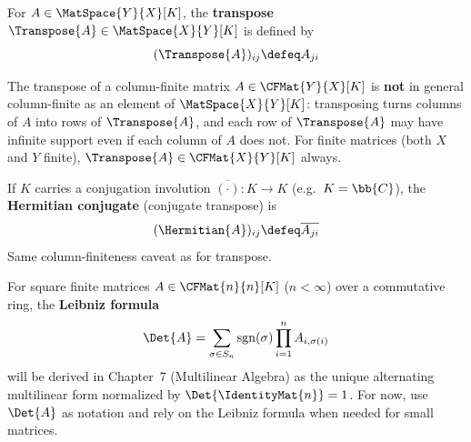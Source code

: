 \begin{definition}[Transpose]
\label{def:transpose}
    For $A \in \MatSpace{Y}{X}[K]$, the \textbf{transpose} $\Transpose{A} \in \MatSpace{X}{Y}[K]$
    is defined by
    \[
        (\Transpose{A})_{ij} \defeq A_{ji}
    \]
\end{definition}

\begin{remark}
    The transpose of a column-finite matrix $A \in \CFMat{Y}{X}[K]$ is \textbf{not} in general
    column-finite as an element of $\MatSpace{X}{Y}[K]$: transposing turns columns of $A$ into
    rows of $\Transpose{A}$, and each row of $\Transpose{A}$ may have infinite support even if
    each column of $A$ does not. For finite matrices (both $X$ and $Y$ finite),
    $\Transpose{A} \in \CFMat{X}{Y}[K]$ always.
\end{remark}

\begin{definition}
\label{def:hermitian}
    If $K$ carries a conjugation involution $\overline{(\cdot)}: K \to K$ (e.g.\ $K = \bb{C}$),
    the \textbf{Hermitian conjugate} (conjugate transpose) is
    \[
        (\Hermitian{A})_{ij} \defeq \overline{A_{ji}}
    \]
    Same column-finiteness caveat as for transpose.
\end{definition}

\begin{remark}
    For square finite matrices $A \in \CFMat{n}{n}[K]$ ($n < \infty$) over a commutative ring,
    the \textbf{Leibniz formula}
    \[
        \Det{A} = \sum_{\sigma \in S_n} \operatorname{sgn}(\sigma) \prod_{i=1}^{n} A_{i,\sigma(i)}
    \]
    will be derived in Chapter~7 (Multilinear Algebra) as the unique alternating multilinear form
    normalized by $\Det{\IdentityMat{n}} = 1$. For now, use $\Det{A}$ as notation and rely on the Leibniz
    formula when needed for small matrices.
\end{remark}
